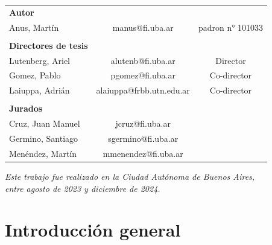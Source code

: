 \documentclass[11pt,a4paper]{article}
\begin{document}
\begin{titlepage}
\begin{table}[htb]
    \begin{tabular}{lcc} 
        \textbf{Autor}              &     &     \\
        Anus, Martín     &    manus@fi.uba.ar & padron n° 101033   \\
        & & \\
         \textbf{Directores de tesis} &         &   \\
         Lutenberg, Ariel       & alutenb@fi.uba.ar & Director  \\
         Gomez, Pablo       & pgomez@fi.uba.ar   & Co-director \\
        Laiuppa, Adrián      & alaiuppa@frbb.utn.edu.ar & Co-director     \\
        & &  \\
         \textbf{Jurados}        & \\
         Cruz, Juan Manuel       & jcruz@fi.uba.ar   & \\
         Germino, Santiago        & sgermino@fi.uba.ar   & \\
         Menéndez, Martín        & mmenendez@fi.uba.ar   & 
        \end{tabular}
     \end{table}



\vspace*{1cm}
	

\textit{\large{Este trabajo fue realizado en la Ciudad Autónoma de Buenos Aires,}} \\
\textit{\large{entre agosto de 2023 y diciembre de 2024.}}

\end{titlepage}

\newpage

\newpage


\newpage
\tableofcontents

\newpage
\listoffigures
\listoftables

\newpage
\setcounter{page}{1}



\section{Introducción general}






\end{document}
